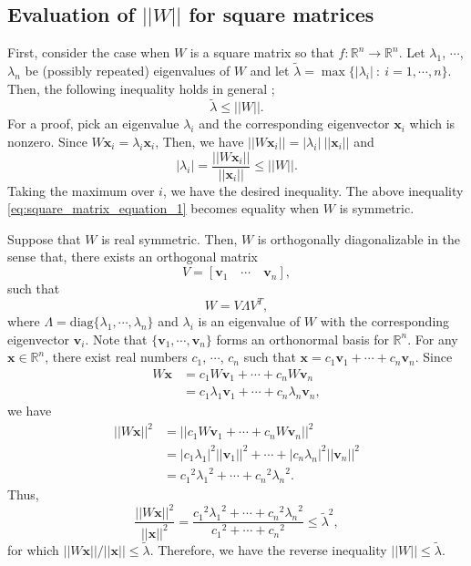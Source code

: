 \documentclass[12pt]{report}
\numberwithin{figure}{chapter}
\theoremstyle{plain}
\theoremstyle{definition}
\theoremstyle{corollary}
\theoremstyle{definition}
\theoremstyle{plain}
\theoremstyle{definition}
\theoremstyle{plain}
\newcommand\bx{\ensuremath{\boldsymbol x}}
\newcommand\bv{\ensuremath{\boldsymbol v}}
\begin{document}
%
\subsection{Evaluation of \(||W||\) for square matrices}

First, consider the case when \(W\) is a square matrix so that \(f:\mathbb R^n\to\mathbb R^n\).
Let \(\lambda_1\), \(\cdots\), \(\lambda_n\) be (possibly repeated) eigenvalues of \(W\) and let \(\tilde\lambda=\max\{|\lambda_i|\::\:i=1,\cdots,n\}\).
Then, the following inequality holds in general ;
\begin{equation}\label{eq:square_matrix_equation_1}
\tilde\lambda\le||W||.
\end{equation}
For a proof, pick an eigenvalue \(\lambda_i\) and the corresponding eigenvector \(\bx_i\) which is nonzero.
Since \(W\bx_i=\lambda_i\bx_i\),
Then, we have \(||W\bx_i||=|\lambda_i|\:||\bx_i||\) and
\[|\lambda_i|=\frac{||W\bx_i||}{||\bx_i||}\le||W||.\]
Taking the maximum over \(i\), we have the desired inequality.
The above inequality \eqref{eq:square_matrix_equation_1} becomes equality when \(W\) is symmetric.

Suppose that \(W\) is real symmetric.
Then, \(W\) is orthogonally diagonalizable in the sense that, there exists an orthogonal matrix
\[V=[\bv_1\quad \cdots \quad \bv_n],\]
such that
\[W=V\Lambda V^T,\]
where \(\Lambda=\text{diag}\{\lambda_1,\cdots,\lambda_n\}\) and \(\lambda_i\) is an eigenvalue of \(W\) with the corresponding eigenvector \(\bv_i\).
Note that \(\{\bv_1,\cdots,\bv_n\}\) forms an orthonormal basis for \(\mathbb R^n\).
For any \(\bx\in\mathbb R^n\), there exist real numbers \(c_1\), \(\cdots\), \(c_n\) such that \(\bx=c_1\bv_1+\cdots+c_n\bv_n\).
Since
\begin{align*}
W\bx
&=c_1W\bv_1+\cdots+c_nW\bv_n\\
&=c_1\lambda_1\bv_1+\cdots+c_n\lambda_n\bv_n,
\end{align*}
we have
\begin{align*}
||W\bx||^2
&=||c_1W\bv_1+\cdots+c_nW\bv_n||^2\\
&=|c_1\lambda_1|^2||\bv_1||^2+\cdots+|c_n\lambda_n|^2||\bv_n||^2\\
&={c_1}^2{\lambda_1}^2+\cdots+{c_n}^2{\lambda_n}^2.
\end{align*}
Thus,
\[\frac{||W\bx||^2}{||\bx||^2}=\frac{{c_1}^2{\lambda_1}^2+\cdots+{c_n}^2{\lambda_n}^2}{{c_1}^2+\cdots+{c_n}^2}
\le{\tilde\lambda}^2,\]
for which \(||W\bx||/||\bx||\le\tilde\lambda\).
Therefore, we have the reverse inequality \(||W||\le\tilde\lambda\).
\end{document}
